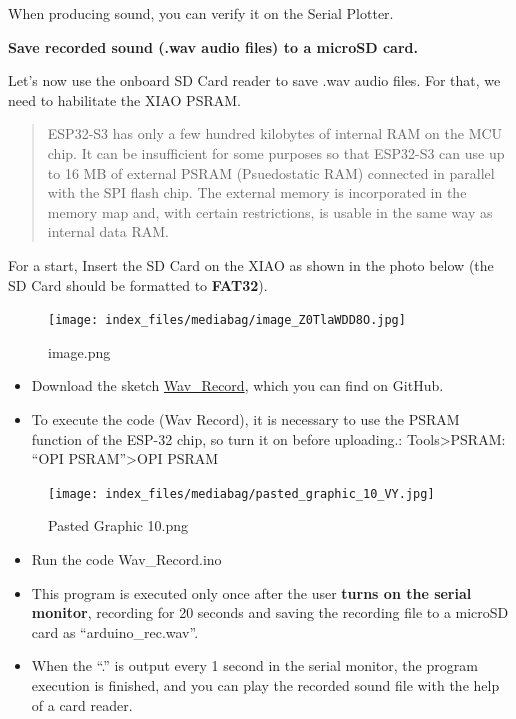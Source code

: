 \documentclass[
  letterpaper,
  DIV=11,
  numbers=noendperiod]{scrreprt}
\providecommand{\tightlist}{%
  \setlength{\itemsep}{0pt}\setlength{\parskip}{0pt}}\usepackage{longtable,booktabs,array}
\begin{document}
When producing sound, you can verify it on the Serial Plotter.

\textbf{Save recorded sound (.wav audio files) to a microSD card.}

Let's now use the onboard SD Card reader to save .wav audio files. For
that, we need to habilitate the XIAO PSRAM.

\begin{quote}
ESP32-S3 has only a few hundred kilobytes of internal RAM on the MCU
chip. It can be insufficient for some purposes so that ESP32-S3 can use
up to 16 MB of external PSRAM (Psuedostatic RAM) connected in parallel
with the SPI flash chip. The external memory is incorporated in the
memory map and, with certain restrictions, is usable in the same way as
internal data RAM.
\end{quote}

For a start, Insert the SD Card on the XIAO as shown in the photo below
(the SD Card should be formatted to \textbf{FAT32}).

\begin{figure}[H]

{\centering \texttt{[image: index\_files/mediabag/image\_Z0TlaWDD8O.jpg]}

}

\caption{image.png}

\end{figure}

\begin{itemize}
\tightlist
\item
  Download the sketch
  \href{https://github.com/Mjrovai/XIAO-ESP32S3-Sense/tree/main/Mic_Test/Wav_Record}{Wav\_Record},
  which you can find on GitHub.
\item
  To execute the code (Wav Record), it is necessary to use the PSRAM
  function of the ESP-32 chip, so turn it on before uploading.:
  Tools\textgreater PSRAM: ``OPI PSRAM''\textgreater OPI PSRAM
\end{itemize}

\begin{figure}[H]

{\centering \texttt{[image: index\_files/mediabag/pasted\_graphic\_10\_VY.jpg]}

}

\caption{Pasted Graphic 10.png}

\end{figure}

\begin{itemize}
\tightlist
\item
  Run the code Wav\_Record.ino
\item
  This program is executed only once after the user \textbf{turns on the
  serial monitor}, recording for 20 seconds and saving the recording
  file to a microSD card as ``arduino\_rec.wav''.
\item
  When the ``.'' is output every 1 second in the serial monitor, the
  program execution is finished, and you can play the recorded sound
  file with the help of a card reader.
\end{itemize}
\end{document}
